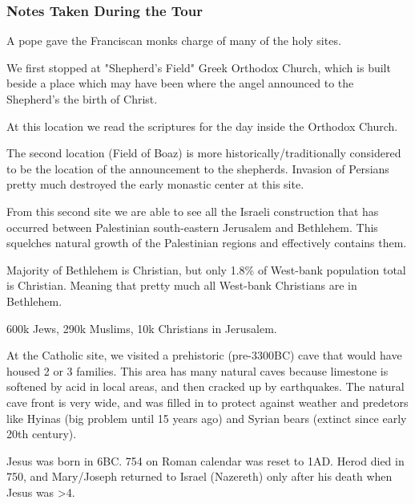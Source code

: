 \documentclass[letterpaper]{report}
\begin{document}
\begin{multicols}{2}
\subsubsection{Notes Taken During the Tour}
A pope gave the Franciscan monks charge of many of the holy sites.

We first stopped at "Shepherd's Field" Greek Orthodox Church, which is built beside a place which may have been where the angel announced to the Shepherd's the birth of Christ.

At this location we read the scriptures for the day inside the Orthodox Church.

The second location (Field of Boaz) is more historically/traditionally considered to be the location of the announcement to the shepherds.
Invasion of Persians pretty much destroyed the early monastic center at this site.

From this second site we are able to see all the Israeli construction that has occurred between Palestinian south-eastern Jerusalem and Bethlehem. This squelches natural growth of the Palestinian regions and effectively contains them.

Majority of Bethlehem is Christian, but only 1.8\% of West-bank population total is Christian. Meaning that pretty much all West-bank Christians are in Bethlehem.

600k Jews, 290k Muslims, 10k Christians in Jerusalem.

At the Catholic site, we visited a prehistoric (pre-3300BC) cave that would have housed 2 or 3 families. This area has many natural caves because limestone is softened by acid in local areas, and then cracked up by earthquakes. The natural cave front is very wide, and was filled in to protect against weather and predetors like Hyinas (big problem until 15 years ago) and Syrian bears (extinct since early 20th century).

Jesus was born in 6BC. 754 on Roman calendar was reset to 1AD. Herod died in 750, and Mary/Joseph returned to Israel (Nazereth) only after his death when Jesus was >4.
\end{multicols}
\end{document}
